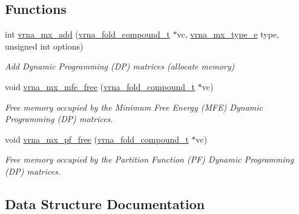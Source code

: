 \subsection*{Functions}
\begin{DoxyCompactItemize}
\item 
int \mbox{\hyperlink{group__dp__matrices_ga08661f098008961dab0023bf300f0c33}{vrna\+\_\+mx\+\_\+add}} (\mbox{\hyperlink{group__fold__compound_ga1b0cef17fd40466cef5968eaeeff6166}{vrna\+\_\+fold\+\_\+compound\+\_\+t}} $\ast$vc, \mbox{\hyperlink{group__dp__matrices_ga6042ea1d58d01931e959791be6d89343}{vrna\+\_\+mx\+\_\+type\+\_\+e}} type, unsigned int options)
\begin{DoxyCompactList}\small\item\em Add Dynamic Programming (DP) matrices (allocate memory) \end{DoxyCompactList}\item 
void \mbox{\hyperlink{group__dp__matrices_ga6a9422feb5dfe5c64050cebf447672d0}{vrna\+\_\+mx\+\_\+mfe\+\_\+free}} (\mbox{\hyperlink{group__fold__compound_ga1b0cef17fd40466cef5968eaeeff6166}{vrna\+\_\+fold\+\_\+compound\+\_\+t}} $\ast$vc)
\begin{DoxyCompactList}\small\item\em Free memory occupied by the Minimum Free Energy (M\+FE) Dynamic Programming (DP) matrices. \end{DoxyCompactList}\item 
void \mbox{\hyperlink{group__dp__matrices_ga2283e69fd139fb8e58d7ade3b5773f9c}{vrna\+\_\+mx\+\_\+pf\+\_\+free}} (\mbox{\hyperlink{group__fold__compound_ga1b0cef17fd40466cef5968eaeeff6166}{vrna\+\_\+fold\+\_\+compound\+\_\+t}} $\ast$vc)
\begin{DoxyCompactList}\small\item\em Free memory occupied by the Partition Function (PF) Dynamic Programming (DP) matrices. \end{DoxyCompactList}\end{DoxyCompactItemize}


\subsection{Data Structure Documentation}
\label{structvrna__mx__mfe__s}
